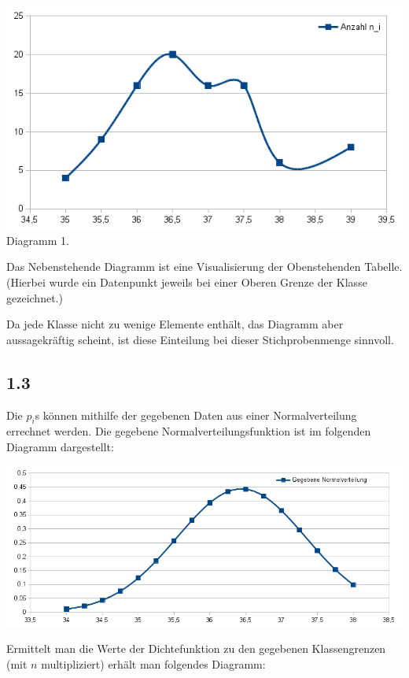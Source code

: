 \documentclass[12pt,a4paper]{article}
\begin{document}
\noindent
\begin{minipage}{0.6\textwidth}
\includegraphics[scale=0.56]{1_2_diagram}
Diagramm 1.
\\
\end{minipage}
\begin{minipage}{0.4\textwidth}
Das Nebenstehende Diagramm ist eine Visualisierung der Obenstehenden Tabelle. (Hierbei wurde ein Datenpunkt jeweils bei einer Oberen Grenze der Klasse gezeichnet.)

Da jede Klasse nicht zu wenige Elemente enthält, das Diagramm aber aussagekräftig scheint, ist diese Einteilung bei dieser Stichprobenmenge sinnvoll.
\end{minipage}

\subsection*{1.3}
Die $p_i$s können mithilfe der gegebenen Daten aus einer Normalverteilung errechnet werden. Die gegebene Normalverteilungsfunktion ist im folgenden Diagramm dargestellt:

\includegraphics[scale=0.7]{1_3_normvert}

Ermittelt man die Werte der Dichtefunktion zu den gegebenen Klassengrenzen (mit $n$ multipliziert) erhält man folgendes Diagramm:
\end{document}
